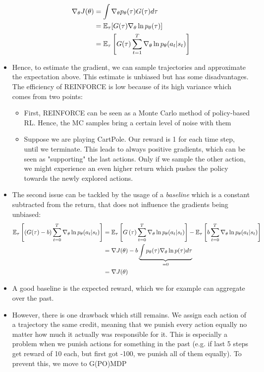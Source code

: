 \begin{itemize}
	\begin{equation*}
		\begin{split}
			\nabla_{\theta}J(\theta) & = \int \nabla_{\theta} p_{\theta}(\tau) G(\tau)d\tau\\
			& = \mathbb{E}_{\tau}[G(\tau)\nabla_{\theta} \ln p_{\theta}(\tau)]\\
			& = \mathbb{E}_{\tau}\left[G(\tau)\sum_{t=1}^{T}\nabla_{\theta} \ln p_{\theta}(a_t|s_t)\right]\\
		\end{split}
	\end{equation*}
	\item Hence, to estimate the gradient, we can sample trajectories and approximate the expectation above. This estimate is unbiased but has some disadvantages. The efficiency of REINFORCE is low because of its high variance which comes from two points:
	\begin{itemize}
		\item First, REINFORCE can be seen as a Monte Carlo method of policy-based RL. Hence, the MC samples bring a certain level of noise with them
		\item Suppose we are playing CartPole. Our reward is 1 for each time step, until we terminate. This leads to always positive gradients, which can be seen as "supporting" the last actions. Only if we sample the other action, we might experience an even higher return which pushes the policy towards the newly explored actions. 
	\end{itemize}
	\item The second issue can be tackled by the usage of a \textit{baseline} which is a constant subtracted from the return, that does not influence the gradients being unbiased:
	\begin{equation*}
		\begin{split}
			\mathbb{E}_{\tau}\left[\left(G(\tau)-b\right)\sum_{t=0}^{T}\nabla_{\theta} \ln p_{\theta}(a_t|s_t)\right] & = \mathbb{E}_{\tau}\left[G\left(\tau\right)\sum_{t=0}^{T}\nabla_{\theta} \ln p_{\theta}(a_t|s_t)\right]  - \mathbb{E}_{\tau}\left[b\sum_{t=0}^{T}\nabla_{\theta} \ln p_{\theta}(a_t|s_t)\right] \\
			& = \nabla J(\theta) - b\underbrace{\int p_{\theta}(\tau)\nabla_{\theta} \ln p(\tau)d\tau}_{=0}\\
			& = \nabla J(\theta) 
		\end{split}
	\end{equation*}
	\item A good baseline is the expected reward, which we for example can aggregate over the past.
	\item However, there is one drawback which still remains. We assign each action of a trajectory the same credit, meaning that we punish every action equally no matter how much it actually was responsible for it. This is especially a problem when we punish actions for something in the past (e.g. if last 5 steps get reward of 10 each, but first got -100, we punish all of them equally). To prevent this, we move to G(PO)MDP
\end{itemize}
